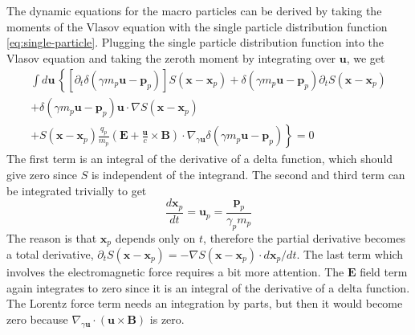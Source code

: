 The dynamic equations for the macro particles can be derived by taking
the moments of the Vlasov equation with the single particle
distribution function \eqref{eq:single-particle}. Plugging the single
particle distribution function into the Vlasov equation and taking the
zeroth moment by integrating over $\mathbf{u}$, we get
\begin{equation}
\begin{split}
    \int d\mathbf{u}\,\left\{ \left[ \partial_t \delta(\gamma m_{p}\mathbf{u} - \mathbf{p}_p) \right]S(\mathbf{x} - \mathbf{x}_p) + \delta(\gamma m_{p}\mathbf{u} - \mathbf{p}_p)\partial_tS(\mathbf{x} - \mathbf{x}_p) \right. \\
    + \delta(\gamma m_{p}\mathbf{u} - \mathbf{p}_p) \mathbf{u}\cdot\nabla S(\mathbf{x} - \mathbf{x}_p) \\
    \left. + S(\mathbf{x} - \mathbf{x}_p)\frac{q_p}{m_p}\left(\mathbf{E} + \frac{\mathbf{u}}{c}\times \mathbf{B}\right)\cdot \nabla_{\gamma \mathbf{u}}\delta(\gamma m_{p}\mathbf{u} - \mathbf{p}_p) \right\} = 0
\end{split}
\end{equation}
The first term is an integral of the derivative of a delta function,
which should give zero since $S$ is independent of the integrand. The
second and third term can be integrated trivially to get
\begin{equation}
  \label{eq:eom-position}
\frac{d\mathbf{x}_p}{dt} = \mathbf{u}_p = \frac{\mathbf{p}_p}{\gamma_p m_{p}}
\end{equation}
The reason is that $\mathbf{x}_p$ depends only on $t$, therefore
the partial derivative becomes a total derivative,
$\partial_tS(\mathbf{x} - \mathbf{x}_p) = -\nabla
S(\mathbf{x} - \mathbf{x}_p) \cdot d\mathbf{x}_p/dt$. The
last term which involves the electromagnetic force requires a bit more
attention. The $\mathbf{E}$ field term again integrates to zero
since it is an integral of the derivative of a delta function. The
Lorentz force term needs an integration by parts, but then it would
become zero because $\nabla_{\gamma
  \mathbf{u}}\cdot(\mathbf{u}\times \mathbf{B})$ is zero.


